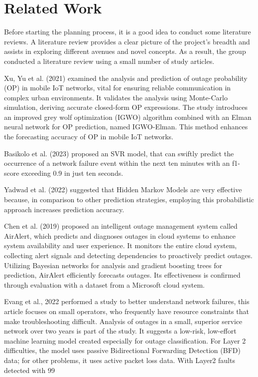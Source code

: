 \section{Related Work}

Before starting the planning process, it is a good idea to conduct some literature reviews. A literature review provides a clear picture of the project's breadth and assists in exploring different avenues and novel concepts. As a result, the group conducted a literature review using a small number of study articles.

Xu, Yu et al. (2021) examined the analysis and prediction of outage probability (OP) in mobile IoT networks, vital for ensuring reliable communication in complex urban environments. It validates the analysis using Monte-Carlo simulation, deriving accurate closed-form OP expressions. The study introduces an improved grey wolf optimization (IGWO) algorithm combined with an Elman neural network for OP prediction, named IGWO-Elman. This method enhances the forecasting accuracy of OP in mobile IoT networks.\cite{xu2021intelligent}

Basikolo et al. (2023) proposed an SVR model, that can swiftly predict the occurrence of a network failure event within the next ten minutes with an f1-score exceeding 0.9 in just ten seconds.\cite{article}

Yadwad et al. (2022) suggested that Hidden Markov Models are very effective because, in comparison to other prediction strategies, employing this probabilistic approach increases prediction accuracy.\cite{yadwad2022fault}

Chen et al. (2019) proposed an intelligent outage management system called AirAlert, which predicts and diagnoses outages in cloud systems to enhance system availability and user experience. It monitors the entire cloud system, collecting alert signals and detecting dependencies to proactively predict outages. Utilizing Bayesian networks for analysis and gradient boosting trees for prediction, AirAlert efficiently forecasts outages. Its effectiveness is confirmed through evaluation with a dataset from a Microsoft cloud system.\cite{chen2019outage}

Evang et al., 2022 performed a study to better understand network failures, this article focuses on small operators, who frequently have resource constraints that make troubleshooting difficult. Analysis of outages in a small, superior service network over two years is part of the study. It suggests a low-risk, low-effort machine learning model created especially for outage classification. For Layer 2 difficulties, the model uses passive Bidirectional Forwarding Detection (BFD) data; for other problems, it uses active packet loss data. With Layer2 faults detected with 99%
\cite{evang2022crosslayer}



